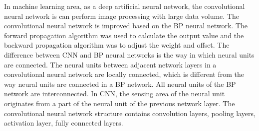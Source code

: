 In machine learning area, as a deep artificial neural network,  the convolutional neural network is can perform image processing with large data volume.
The convolutional neural network is improved based on the BP neural network.\cite{howard2013some} The forward propagation algorithm was used to calculate the output value and the backward propagation algorithm  was to adjust the weight and offset. 
The difference between CNN and BP neural networks is the way in which neural units are connected. \cite{Ketkar2017Convolutional} The neural units between adjacent network layers in a convolutional neural network are locally connected, which is different from the way neural units are connected in a BP network. All neural units of the BP network are interconnected. 
In CNN, the sensing area of the neural unit originates from a part of the neural unit of the previous network layer. The convolutional neural network structure contains convolution layers, pooling layers, activation layer, fully connected layers.\cite{lin2013network}


